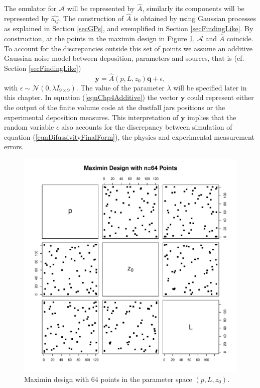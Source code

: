 \documentclass{sfuthesis}
\newcommand{\q}{\textbf{q}}
\newcommand{\y}{\textbf{y}}
\begin{document}
The emulator for $\mathscr{A}$ will be represented by $\widehat{A}$, similarly its components
will be represented by $\hat{a_{ij}}$. The
construction of $\widehat{A}$ is obtained by 
using Gaussian processes as explained in Section \ref{secGPs}, and
exemplified in  Section \ref{secFindingLike}. By construction,
at the points in the maximin design in Figure \ref{figParticleSwarm}, $\mathscr{A}$
and $\widehat{A}$ coincide. To account for the discrepancies outside this
set of points
we assume an additive Gaussian noise model between deposition, parameters
and sources, that is (cf. Section \ref{secFindingLike})
\begin{equation}\label{eqnChp4Additive}
\y=\widehat{A}(p,L,z_{0})\q+\epsilon,
\end{equation} 
with $\epsilon\sim\mathcal{N}(0,\lambda I_{9\times 9})$. The value of 
the parameter $\lambda$ will be specified  later in this chapter. 
In equation (\ref{eqnChp4Additive})
the vector $\y$ could represent either the output of the finite volume 
code at the dustfall jars positions or the experimental deposition measures. 
This interpretation of $\y$ implies  that the random variable $\epsilon$ also
accounts for the discrepancy between simulation 
of equation (\ref{eqnDifussivityFinalForm}), the physics and 
experimental measurement errors.
\begin{figure}[H]
\centering
\includegraphics[scale=0.6]{./FigChap4/experimentalDesign64}
\caption{Maximin design with 64 points in the parameter space $(p,L,z_{0})$.}
\label{figParticleSwarm}
\end{figure}
\end{document}
